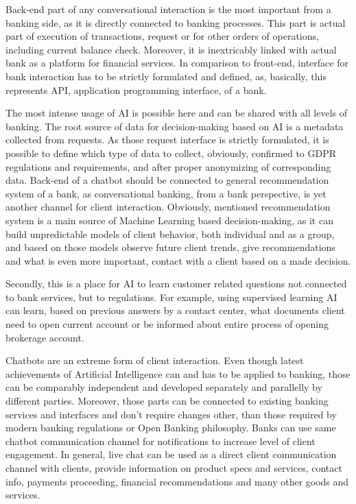 Back-end part of any conversational interaction is the most important from a banking side, as it is directly connected to banking processes.
This part is actual part of execution of transactions, request or for other orders of operations, including current balance check.
Moreover, it is inextricably linked with actual bank as a platform for financial services.
In comparison to front-end, interface for bank interaction has to be strictly formulated and defined, as, basically, this represents API, application programming interface, of a bank.

The most intense usage of AI is possible here and can be shared with all levels of banking.
The root source of data for decision-making based on AI is a metadata collected from requests.
As those request interface is strictly formulated, it is possible to define which type of data to collect, obviously, confirmed to GDPR regulations and requirements, and after proper anonymizing of corresponding data.
Back-end of a chatbot should be connected to general recommendation system of a bank, as conversational banking, from a bank perspective, is yet another channel for client interaction.
Obviously, mentioned recommendation system is a main source of Machine Learning based decision-making, as it can build unpredictable models of client behavior, both individual and as a group, and based on those models observe future client trends, give recommendations and what is even more important, contact with a client based on a made decision.

Secondly, this is a place for AI to learn customer related questions not connected to bank services, but to regulations.
For example, using supervised learning AI can learn, based on previous answers by a contact center, what documents client need to open current account or be informed about entire process of opening brokerage account.

Chatbots are an extreme form of client interaction.
Even though latest achievements of Artificial Intelligence can and has to be applied to banking, those can be comparably independent and developed separately and parallelly by different parties.
Moreover, those parts can be connected to existing banking services and interfaces and don't require changes other, than those required by modern banking regulations or Open Banking philosophy.
Banks can use same chatbot communication channel for notifications to increase level of client engagement.
In general, live chat can be used as a direct client communication channel with clients, provide information on product specs and services, contact info, payments proceeding, financial recommendations and many other goods and services.

